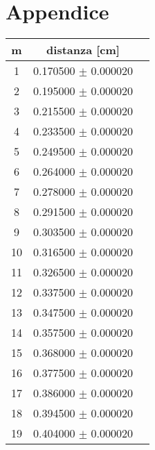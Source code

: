 \appendix
\section{Appendice} \label{sec:Appendice}
\begin{table}[H]
\begin{tabular}{c|c|c} 
	m & distanza [cm]\\
	\hline
	1& 0.170500 $\pm$ 0.000020\\
	2& 0.195000 $\pm$ 0.000020\\
	3& 0.215500 $\pm$ 0.000020\\
	4& 0.233500 $\pm$ 0.000020\\
	5& 0.249500 $\pm$ 0.000020\\
	6& 0.264000 $\pm$ 0.000020\\
	7& 0.278000 $\pm$ 0.000020\\
	8& 0.291500 $\pm$ 0.000020\\
	9& 0.303500 $\pm$ 0.000020\\
	10& 0.316500 $\pm$ 0.000020\\
	11& 0.326500 $\pm$ 0.000020\\
	12& 0.337500 $\pm$ 0.000020\\
	13& 0.347500 $\pm$ 0.000020\\
	14& 0.357500 $\pm$ 0.000020\\
	15& 0.368000 $\pm$ 0.000020\\
	16& 0.377500 $\pm$ 0.000020\\
	17& 0.386000 $\pm$ 0.000020\\
	18& 0.394500 $\pm$ 0.000020\\
	19& 0.404000 $\pm$ 0.000020\\
\end{tabular}
\label{data}
\end{table}


